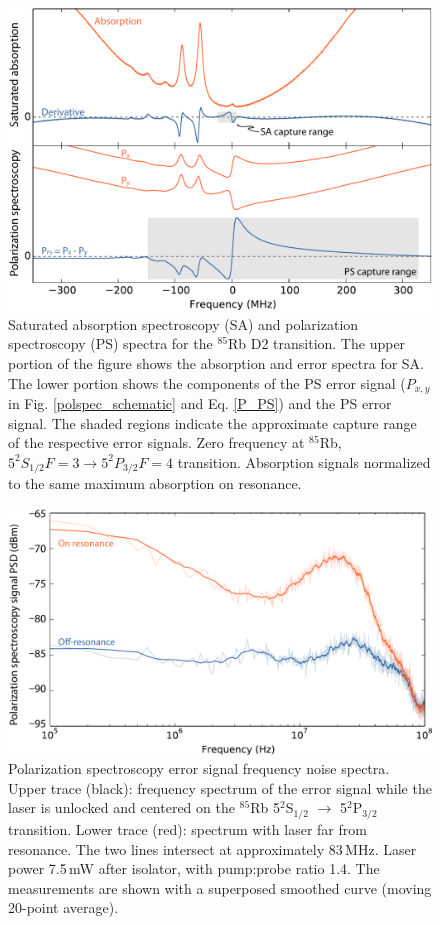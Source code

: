 \begin{figure}[htbp]
    \centering
    \includegraphics[width=\linewidth]{chapter1/Figs/fig2_v1.pdf}
    \caption{Saturated absorption spectroscopy (SA) and polarization spectroscopy (PS) spectra for the $^{85}$Rb D2 transition. The upper portion of the figure shows the absorption and error spectra for SA. The lower portion shows the components of the PS error signal ($P_{x,y}$ in Fig. \ref{polspec_schematic} and Eq. \ref{P_PS}) and the PS error signal. The shaded regions indicate the approximate capture range of the respective error signals. Zero frequency at $^{85}$Rb, $5^2S_{1/2} F=3\rightarrow5^2P_{3/2} F=4$ transition.  Absorption signals normalized to the same maximum absorption on resonance.}
    \label{sa_ps_spectra}
\end{figure}

\begin{figure}[hbp]
    \centering
    \includegraphics[width=\linewidth]{chapter1/Figs/fig3_v1.pdf}
    \caption{Polarization spectroscopy error signal frequency noise spectra. Upper trace (black): frequency spectrum of the error signal while the laser is unlocked and centered on the $^{85}$Rb 5$^\text{2}$S$_\text{1/2}$ $\rightarrow$ 5$^\text{2}$P$_\text{3/2}$ transition.  Lower trace (red): spectrum with laser far from resonance. The two lines intersect at approximately 83\,MHz.  Laser power 7.5\,mW after isolator, with pump:probe ratio 1.4.  The measurements are shown with a superposed smoothed curve (moving 20-point average).}
    \label{bandwidth}
\end{figure}

